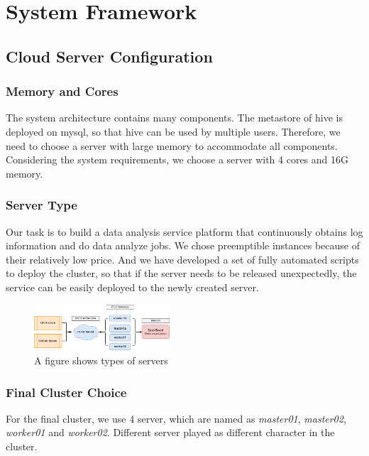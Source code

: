 \section{System Framework}

\subsection{Cloud Server Configuration}

\subsubsection{Memory and Cores}

The system architecture contains many components. The metastore of hive is deployed on mysql, so that hive can be used by multiple users. Therefore, we need to choose a server with large memory to accommodate all components. Considering the system requirements, we choose a server with 4 cores and 16G memory.


\subsubsection{Server Type}

Our task is to build a data analysis service platform that continuously obtains log information and do data analyze jobs. We chose preemptible instances because of their relatively low price. And we have developed a set of fully automated scripts to deploy the cluster, so that if the server needs to be released unexpectedly, the service can be easily deployed to the newly created server.


\begin{figure}[H]
    \centering
    \includegraphics[width=0.45\textwidth]{./pic/server.png}
    \caption{A figure shows types of servers}
    \label{fig:server}
\end{figure}



\subsubsection{Final Cluster Choice}


For the final cluster, we use 4 server, which are named as \textit{master01}, \textit{master02}, \textit{worker01} and \textit{worker02}. Different server played as different character in the cluster.



